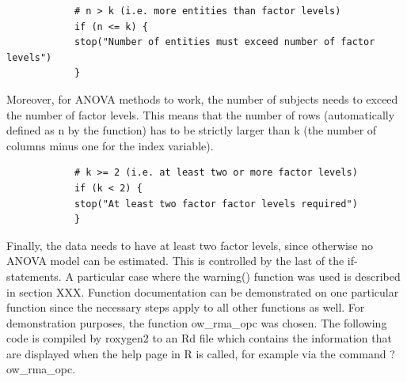 \documentclass[11pt]{article}
\begin{document}
		\begin{lstlisting}
			# n > k (i.e. more entities than factor levels)
			if (n <= k) {
			stop("Number of entities must exceed number of factor levels")
			}
		\end{lstlisting}
		
		Moreover, for ANOVA methods to work, the number of subjects needs to exceed the number of factor levels. This means that the number of rows (automatically defined as n by the function) has to be strictly larger than k (the number of columns minus one for the index variable).\\
		
		\begin{lstlisting}
		    # k >= 2 (i.e. at least two or more factor levels)
		    if (k < 2) {
		    stop("At least two factor factor levels required")
		    }  
		\end{lstlisting}
		
		Finally, the data needs to have at least two factor levels, since otherwise no ANOVA model can be estimated. This is controlled by the last of the if-statements.
		A particular case where the warning() function was used is described in section XXX.
		Function documentation can be demonstrated on one particular function since the necessary steps apply to all other functions as well. For demonstration purposes, the function ow\_rma\_opc was chosen. The following code is compiled by roxygen2 to an Rd file which contains the information that are displayed when the help page in R is called, for example via the command ?ow\_rma\_opc.\\
		
\end{document}
